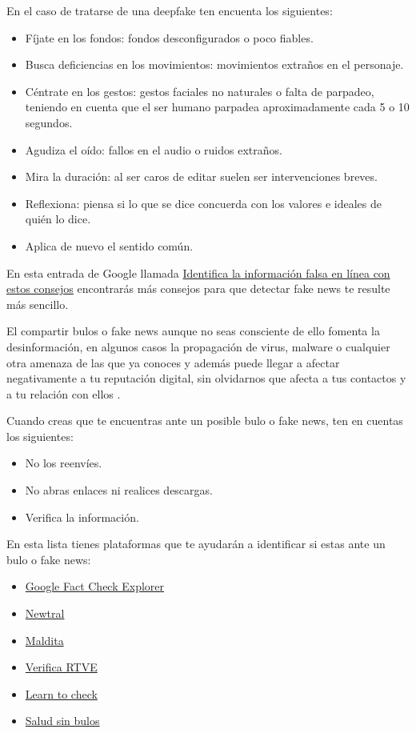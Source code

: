 \documentclass[
  a4paper,
  openany]{book}
\begin{document}
En el caso de tratarse de una deepfake ten encuenta los siguientes:

\begin{itemize}
\item
  Fíjate en los fondos: fondos desconfigurados o poco fiables.
\item
  Busca deficiencias en los movimientos: movimientos extraños en el personaje.
\item
  Céntrate en los gestos: gestos faciales no naturales o falta de parpadeo, teniendo en cuenta que el ser humano parpadea aproximadamente cada 5 o 10 segundos.
\item
  Agudiza el oído: fallos en el audio o ruidos extraños.
\item
  Mira la duración: al ser caros de editar suelen ser intervenciones breves.
\item
  Reflexiona: piensa si lo que se dice concuerda con los valores e ideales de quién lo dice.
\item
  Aplica de nuevo el sentido común.
\end{itemize}

En esta entrada de Google llamada \href{https://blog.google/products/news/consejos-verificacion-hechos/}{Identifica la información falsa en línea con estos consejos} encontrarás más consejos para que detectar fake news te resulte más sencillo.

El compartir bulos o fake news aunque no seas consciente de ello fomenta la desinformación, en algunos casos la propagación de virus, malware o cualquier otra amenaza de las que ya conoces y además puede llegar a afectar negativamente a tu reputación digital, sin olvidarnos que afecta a tus contactos y a tu relación con ellos \citep{OSI-frena-evita-bulos}.

Cuando creas que te encuentras ante un posible bulo o fake news, ten en cuentas los siguientes:

\begin{itemize}
\item
  No los reenvíes.
\item
  No abras enlaces ni realices descargas.
\item
  Verifica la información.
\end{itemize}

En esta lista tienes plataformas que te ayudarán a identificar si estas ante un bulo o fake news:

\begin{itemize}
\item
  \href{https://toolbox.google.com/factcheck/explorer}{Google Fact Check Explorer}
\item
  \href{https://www.newtral.es/zona-verificacion/fact-check/}{Newtral}
\item
  \href{https://maldita.es/malditobulo/1}{Maldita}
\item
  \href{https://www.rtve.es/noticias/verificartve/}{Verifica RTVE}
\item
  \href{https://learntocheck.org/}{Learn to check}
\item
  \href{https://saludsinbulos.com/}{Salud sin bulos}
\end{itemize}
\end{document}
